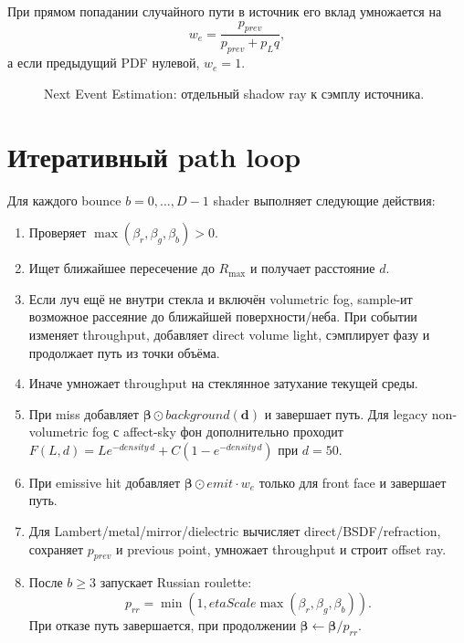 \documentclass[11pt,a4paper]{article}
\newcommand{\vect}[1]{\boldsymbol{#1}}
\begin{document}
При прямом попадании случайного пути в источник его вклад умножается на
\[
 w_e=\frac{p_{prev}}{p_{prev}+p_Lq},
\]
а если предыдущий PDF нулевой, $w_e=1$.

\begin{figure}[ht]
\centering
{}
\caption{Next Event Estimation: отдельный shadow ray к сэмплу источника.}
\end{figure}

\section{Итеративный path loop}

Для каждого bounce $b=0,\ldots,D-1$ shader выполняет следующие действия:

\begin{enumerate}
\item Проверяет $\max(\beta_r,\beta_g,\beta_b)>0$.
\item Ищет ближайшее пересечение до $R_{\max}$ и получает расстояние $d$.
\item Если луч ещё не внутри стекла и включён volumetric fog, sample-ит возможное
  рассеяние до ближайшей поверхности/неба. При событии изменяет throughput, добавляет
  direct volume light, сэмплирует фазу и продолжает путь из точки объёма.
\item Иначе умножает throughput на стеклянное затухание текущей среды.
\item При miss добавляет $\vect\beta\odot background(\vect d)$ и завершает путь.
  Для legacy non-volumetric fog с affect-sky фон дополнительно проходит
  $F(L,d)=Le^{-density\,d}+C(1-e^{-density\,d})$ при $d=50$.
\item При emissive hit добавляет $\vect\beta\odot emit\cdot w_e$ только для
  front face и завершает путь.
\item Для Lambert/metal/mirror/dielectric вычисляет direct/BSDF/refraction,
  сохраняет $p_{prev}$ и previous point, умножает throughput и строит offset ray.
\item После $b\ge3$ запускает Russian roulette:
  \[
   p_{rr}=\min(1,etaScale\max(\beta_r,\beta_g,\beta_b)).
  \]
  При отказе путь завершается, при продолжении $\vect\beta\leftarrow\vect\beta/p_{rr}$.
\end{enumerate}
\end{document}

